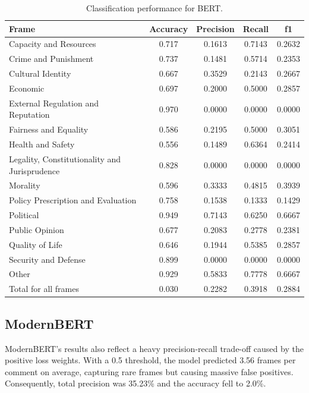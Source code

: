 \documentclass[
10pt, %
a4paper, %
oneside, %
headinclude,footinclude, %
] {book}%
\begin{document}
\begin{table}[htbp]
\centering
\begin{tabular}{|l|c|c|c|c|}
\hline
\textbf{Frame} & \textbf{Accuracy} & \textbf{Precision} & \textbf{Recall} & \textbf{f1} \\
\hline
Capacity and Resources & 0.717 & 0.1613 & 0.7143 & 0.2632 \\\hline
Crime and Punishment & 0.737 & 0.1481 & 0.5714 & 0.2353 \\\hline
Cultural Identity & 0.667 & 0.3529 & 0.2143 & 0.2667 \\\hline
Economic & 0.697 & 0.2000 & 0.5000 & 0.2857 \\\hline
External Regulation and Reputation & 0.970 & 0.0000 & 0.0000 & 0.0000 \\\hline
Fairness and Equality & 0.586 & 0.2195 & 0.5000 & 0.3051 \\\hline
Health and Safety & 0.556 & 0.1489 & 0.6364 & 0.2414 \\\hline
Legality, Constitutionality and Jurisprudence & 0.828 & 0.0000 & 0.0000 & 0.0000 \\\hline
Morality & 0.596 & 0.3333 & 0.4815 & 0.3939 \\\hline
Policy Prescription and Evaluation & 0.758 & 0.1538 & 0.1333 & 0.1429 \\\hline
Political & 0.949 & 0.7143 & 0.6250 & 0.6667 \\\hline
Public Opinion & 0.677 & 0.2083 & 0.2778 & 0.2381 \\\hline
Quality of Life & 0.646 & 0.1944 & 0.5385 & 0.2857 \\\hline
Security and Defense & 0.899 & 0.0000 & 0.0000 & 0.0000 \\
\hline
Other & 0.929 & 0.5833 & 0.7778 & 0.6667 \\\hline
Total for all frames & 0.030 & 0.2282 & 0.3918 & 0.2884 \\
\hline
\end{tabular}
\caption{Classification performance for BERT.}
\label{tab:bert_classification}
\end{table}
    
\subsection{ModernBERT} 
ModernBERT's results also reflect a heavy precision-recall trade-off caused by the positive loss weights. With a 0.5 threshold, the model predicted 3.56 frames per comment on average, capturing rare frames but causing massive false positives. Consequently, total precision was 35.23\% and the accuracy fell to 2.0\%.
\end{document}
